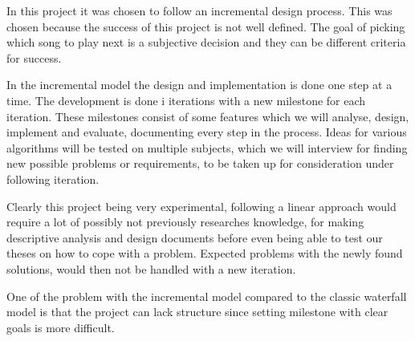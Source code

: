 In this project it was chosen to follow an incremental design process. This was chosen because the success of this project is not well defined. The goal of picking which song to play next is a subjective decision and they can be different criteria for success.

In the incremental model the design and implementation is done one step at a time. The development is done i iterations with a new milestone for each iteration. These milestones consist of some features which we will analyse, design, implement and evaluate, documenting every step in the process. Ideas for various algorithms will be tested on multiple subjects, which we will interview for finding new possible problems or requirements, to be taken up for consideration under following iteration.

Clearly this project being very experimental, following a linear approach would require a lot of possibly not previously researches knowledge, for making descriptive analysis and design documents before even being able to test our theses on how to cope with a problem. Expected problems with the newly found solutions, would then not be handled with a new iteration.

One of the problem with the incremental model compared to the classic waterfall model is that the project can lack structure since setting milestone with clear goals is more difficult.


